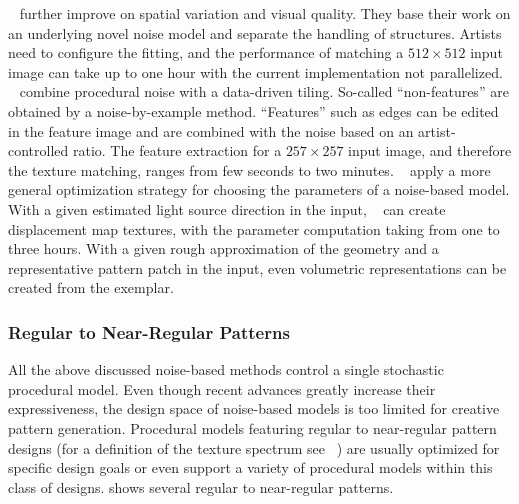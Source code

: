 {\citeauthor*{guingo_2017_btm}~\cite{guingo_2017_btm} further improve on spatial variation and visual quality. They base their work on an underlying novel noise model and separate the handling of structures. Artists need to configure the fitting, and the performance of matching a $512\times512$ input image can take up to one hour with the current implementation not parallelized. \citeauthor*{kang_2017_fpt}~\cite{kang_2017_fpt} combine procedural noise with a data-driven tiling. So-called ``non-features'' are obtained by a noise-by-example method. ``Features'' such as edges can be edited in the feature image and are combined with the noise based on an artist-controlled ratio. The feature extraction for a $257\times257$ input image, and therefore the texture matching, ranges from few seconds to two minutes. \citeauthor*{gilet_2010_ias}~\cite{gilet_2010_ias} apply a more general optimization strategy for choosing the parameters of a noise-based model. With a given estimated light source direction in the input, \citeauthor*{gilet_2010_ias}~\cite{gilet_2010_ias} can create displacement map textures, with the parameter computation taking from one to three hours. With a given rough approximation of the geometry and a representative pattern patch in the input, even volumetric representations can be created from the exemplar.}



\subsubsection{Regular to Near-Regular Patterns}
\label{subsubsec:analysis_distribution_and_repetition_regular}

All the above discussed noise-based methods control a single stochastic procedural model. Even though recent advances greatly increase their expressiveness, the design space of noise-based models is too limited for creative pattern generation. Procedural models featuring regular to near-regular pattern designs (for a definition of the texture spectrum see \citeauthor{lin_2006_qeo}~\cite{lin_2006_qeo}) are usually optimized for specific design goals or even support a variety of procedural models within this class of designs.  shows several regular to near-regular patterns.

